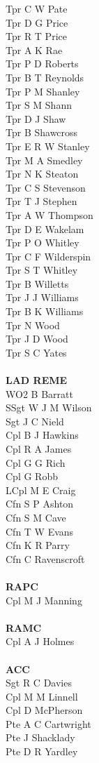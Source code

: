 \begin{multicols}{4}
  Tpr C W Pate \\
  Tpr D G Price \\
  Tpr R T Price \\
  Tpr A K Rae \\
  Tpr P D Roberts \\
  Tpr B T Reynolds \\
  Tpr P M Shanley \\
  Tpr S M Shann \\
  Tpr D J Shaw \\
  Tpr B Shawcross \\
  Tpr E R W Stanley \\
  Tpr M A Smedley \\
  Tpr N K Steaton \\
  Tpr C S Stevenson \\
  Tpr T J Stephen \\
  Tpr A W Thompson \\
  Tpr D E Wakelam \\
  Tpr P O Whitley \\
  Tpr C F Wilderspin \\
  Tpr S T Whitley \\
  Tpr B Willetts \\
  Tpr J J Williams \\
  Tpr B K Williams \\
  Tpr N Wood \\
  Tpr J D Wood \\
  Tpr S C Yates \\
  \\
  \textbf{LAD REME} \\
  WO2 B Barratt \\
  SSgt W J M Wilson \\
  Sgt J C Nield \\
  Cpl B J Hawkins \\
  Cpl R A James \\
  Cpl G G Rich \\
  Cpl G Robb \\
  LCpl M E Craig \\
  Cfn S P Ashton \\
  Cfn S M Cave \\
  Cfn T W Evans \\
  Cfn K R Parry \\
  Cfn C Ravenscroft \\
  \\
  \textbf{RAPC} \\
  Cpl M J Manning \\
  \\
  \textbf{RAMC} \\
  Cpl A J Holmes \\
  \\
  \textbf{ACC} \\
  Sgt R C Davies \\
  Cpl M M Linnell \\
  Cpl D McPherson \\
  Pte A C Cartwright \\
  Pte J Shacklady \\
  Pte D R Yardley
\end{multicols}

\pagebreak

